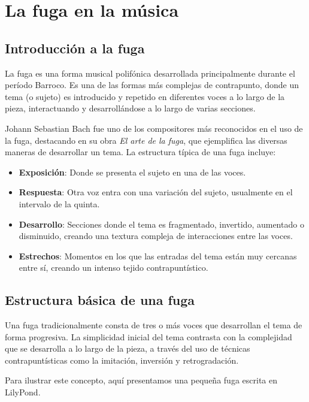 \chapter{La fuga en la música}

\section{Introducción a la fuga}

	La fuga es una forma musical polifónica desarrollada principalmente durante el período Barroco. Es una de las formas más complejas de contrapunto, donde un tema (o sujeto) es introducido y repetido en diferentes voces a lo largo de la pieza, interactuando y desarrollándose a lo largo de varias secciones.

	Johann Sebastian Bach fue uno de los compositores más reconocidos en el uso de la fuga, destacando en su obra \emph{El arte de la fuga}, que ejemplifica las diversas maneras de desarrollar un tema. La estructura típica de una fuga incluye:

	\begin{itemize}
		\item \textbf{Exposición}: Donde se presenta el sujeto en una de las voces.
		\item \textbf{Respuesta}: Otra voz entra con una variación del sujeto, usualmente en el intervalo de la quinta.
		\item \textbf{Desarrollo}: Secciones donde el tema es fragmentado, invertido, aumentado o disminuido, creando una textura compleja de interacciones entre las voces.
		\item \textbf{Estrechos}: Momentos en los que las entradas del tema están muy cercanas entre sí, creando un intenso tejido contrapuntístico.
	\end{itemize}

	\section{Estructura básica de una fuga}

	Una fuga tradicionalmente consta de tres o más voces que desarrollan el tema de forma progresiva. La simplicidad inicial del tema contrasta con la complejidad que se desarrolla a lo largo de la pieza, a través del uso de técnicas contrapuntísticas como la imitación, inversión y retrogradación.

	Para ilustrar este concepto, aquí presentamos una pequeña fuga escrita en LilyPond.

